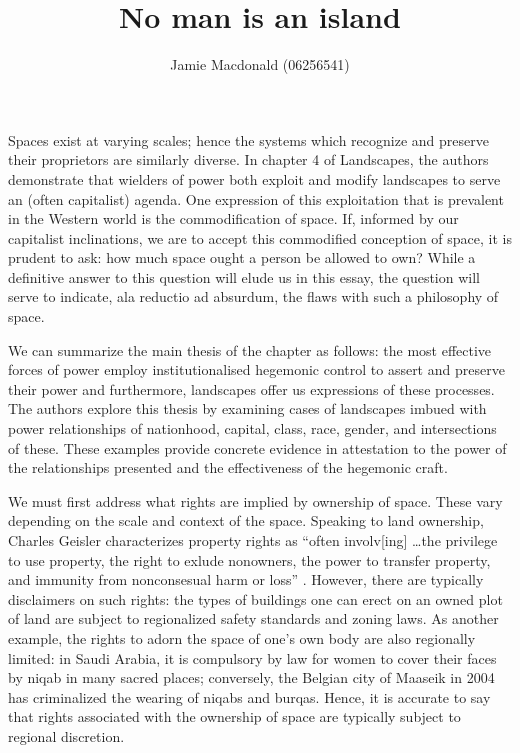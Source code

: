 \documentclass[12pt, letterpaper, oneside]{article}
\title{No man is an island}
\author{Jamie Macdonald (06256541)}
\begin{document}
\maketitle
Spaces exist at varying scales; hence the systems which recognize and preserve their proprietors are similarly diverse. In chapter 4 of Landscapes, the authors demonstrate that wielders of power both exploit and modify landscapes to serve an (often capitalist) agenda. One expression of this exploitation that is prevalent in the Western world is the commodification of space. If, informed by our capitalist inclinations, we are to accept this commodified conception of space, it is prudent to ask: how much space ought a person be allowed to own? While a definitive answer to this question will elude us in this essay, the question will serve to indicate, ala reductio ad absurdum, the flaws with such a philosophy of space.

We can summarize the main thesis of the chapter as follows: the most effective forces of power employ institutionalised hegemonic control to assert and preserve their power and furthermore, landscapes offer us expressions of these processes. The authors explore this thesis by examining cases of landscapes imbued with power relationships of nationhood, capital, class, race, gender, and intersections of these. These examples provide concrete evidence in attestation to the power of the relationships presented and the effectiveness of the hegemonic craft.

We must first address what rights are implied by ownership of space. These vary depending on the scale and context of the space. Speaking to land ownership, Charles Geisler characterizes property rights as ``often involv[ing] \ldots the privilege to use property, the right to exlude nonowners, the power to transfer property, and immunity from nonconsesual harm or loss'' \autocite{geisler2000property}. However, there are typically disclaimers on such rights: the types of buildings one can erect on an owned plot of land are subject to regionalized safety standards and zoning laws.  As another example, the rights to adorn the space of one's own body are also regionally limited: in Saudi Arabia, it is compulsory by law for women to cover their faces by niqab in many sacred places; conversely, the Belgian city of Maaseik in 2004 has criminalized the wearing of niqabs and burqas. Hence, it is accurate to say that rights associated with the ownership of space are typically subject to regional discretion.
\end{document}
